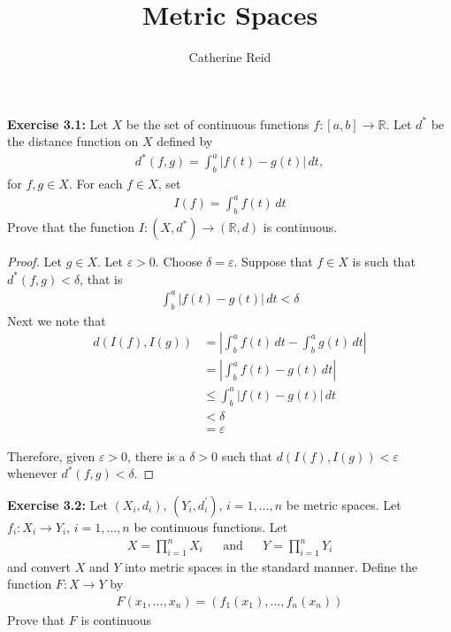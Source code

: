 \documentclass{article}
\author{Catherine Reid}
\title{Metric Spaces}
\begin{document}
\maketitle

\textbf{Exercise 3.1:} Let $X$ be the set of continuous functions $f:[a, b] \to \mathbb{R}$. Let $d^*$ be the distance function
on $X$ defined by
\begin{align*}
    d^*(f, g) = \int_{b}^{a}  \left|f(t) - g(t)\right|\,dt,
\end{align*}
for $f, g \in X$. For each $f \in X$, set
\begin{align*}
    I(f) = \int_{b}^{a} f(t)\,dt
\end{align*}
Prove that the function $I:(X, d^*) \to (\mathbb{R}, d)$ is continuous.

\begin{proof}
    Let $g \in X$. Let $\varepsilon > 0$. Choose $\delta = \varepsilon$. Suppose that $f \in X$ is such
    that $d^*(f, g) < \delta$, that is
    \begin{align*}
        \int_{b}^{a}  \left|f(t) - g(t)\right|\,dt < \delta
    \end{align*}
    Next we note that
    \begin{align*}
        d(I(f), I(g)) &= \left|\int_{b}^{a} f(t)\,dt - \int_{b}^{a} g(t)\,dt\right|\\
        &= \left|\int_{b}^{a} f(t) - g(t)\,dt\right|\\
        &\le \int_{b}^{a} \left|f(t) - g(t)\right|\,dt\\
        &< \delta\\
        &= \varepsilon
    \end{align*}
    
    Therefore, given $\varepsilon > 0$, there is a $\delta > 0$ such that $d(I(f), I(g)) < \varepsilon$ whenever
    $d^*(f, g) < \delta$.
\end{proof}

\pagebreak
\textbf{Exercise 3.2:}  Let $(X_i, d_i)$, $(Y_i, d^\prime_i)$, $i = 1, \dots, n$ be metric spaces. Let $f_i: X_i \to Y_i$,
$i = 1, \dots, n$ be continuous functions. Let
\begin{align*}
    X = \prod_{i = 1}^{n} X_i & & \text{and} & & Y = \prod_{i = 1}^{n} Y_i
\end{align*}
and convert $X$ and $Y$ into metric spaces in the standard manner. Define the function $F: X \to Y$ by
\begin{align*}
    F(x_1, \dots, x_n) = (f_1(x_1), \dots, f_n(x_n))
\end{align*}
Prove that $F$ is continuous
\end{document}
